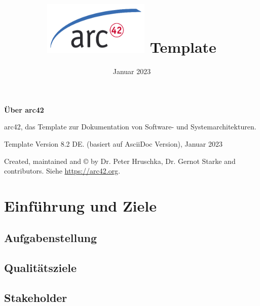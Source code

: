\documentclass[
]{article}
\title{\includegraphics{images/arc42-logo.png} Template}
\author{}
\date{Januar 2023}
\begin{document}
\maketitle

\section{}

\textbf{Über arc42}

arc42, das Template zur Dokumentation von Software- und
Systemarchitekturen.

Template Version 8.2 DE. (basiert auf AsciiDoc Version), Januar 2023

Created, maintained and © by Dr. Peter Hruschka, Dr. Gernot Starke and
contributors. Siehe \url{https://arc42.org}.

\hypertarget{section-introduction-and-goals}{%
  \section{Einführung und Ziele}\label{section-introduction-and-goals}}

\hypertarget{_aufgabenstellung}{%
  \subsection{Aufgabenstellung}\label{_aufgabenstellung}}

\hypertarget{_qualit_tsziele}{%
  \subsection{Qualitätsziele}\label{_qualit_tsziele}}

\hypertarget{_stakeholder}{%
  \subsection{Stakeholder}\label{_stakeholder}}
\end{document}
